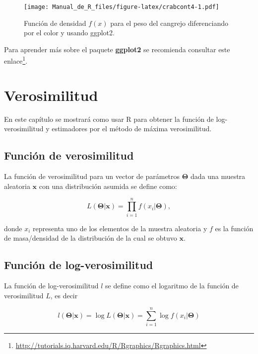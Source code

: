 \documentclass[10pt,]{krantz}
\let\proglang=\textsf
\renewcommand{\href}[2]{#2\footnote{\url{#1}}}
\begin{document}
\begin{figure}[htbp]
\centering
\texttt{[image: Manual\_de\_R\_files/figure-latex/crabcont4-1.pdf]}
\caption{\label{fig:crabcont4}Función de densidad \(f(x)\) para el peso del
cangrejo diferenciando por el color y usando ggplot2.}
\end{figure}

Para aprender más sobre el paquete \textbf{ggplot2} se recomienda
consultar este
\href{http://tutorials.iq.harvard.edu/R/Rgraphics/Rgraphics.html}{enlace}.

\chapter{\texorpdfstring{Verosimilitud
\label{loglik}}{Verosimilitud }}\label{verosimilitud}

En este capítulo se mostrará como usar \proglang{R} para obtener la
función de log-verosimilitud y estimadores por el método de máxima
verosimilitud.

\section{Función de verosimilitud}\label{funcion-de-verosimilitud}

La función de verosimilitud para un vector de parámetros
\(\boldsymbol{\Theta}\) dada una muestra aleatoria \(\boldsymbol{x}\)
con una distribución asumida se define como:

\begin{equation}
L(\boldsymbol{\Theta} | \boldsymbol{x}) = \prod_{i=1}^{n}  f(x_i | \boldsymbol{\Theta}),
\label{eq:lik}
\end{equation}

donde \(x_i\) representa uno de los elementos de la muestra aleatoria y
\(f\) es la función de masa/densidad de la distribución de la cual se
obtuvo \(\boldsymbol{x}\).

\section{Función de
log-verosimilitud}\label{funcion-de-log-verosimilitud}

La función de log-verosimilitud \(l\) se define como el logaritmo de la
función de verosimilitud \(L\), es decir

\begin{equation}
l(\boldsymbol{\Theta} | \boldsymbol{x}) = \log L(\boldsymbol{\Theta} | \boldsymbol{x}) = \sum_{i=1}^{n} \log f(x_i | \boldsymbol{\Theta})
\label{eq:loglik}
\end{equation}
\end{document}
